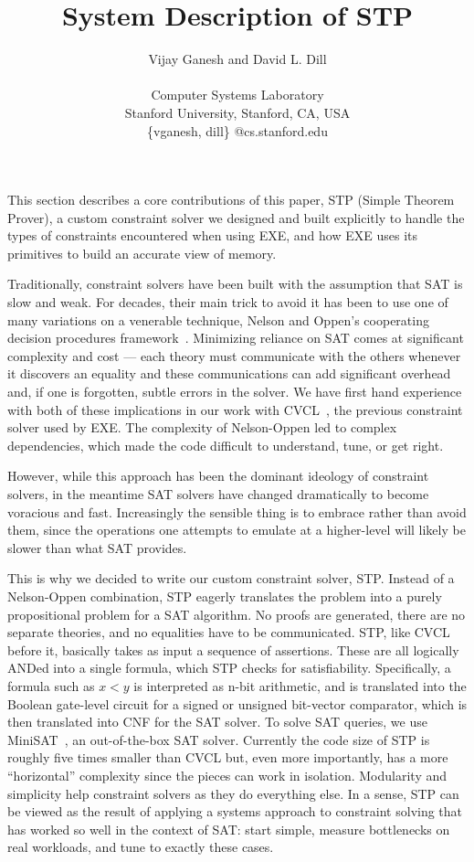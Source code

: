 \documentclass[11pt]{article}
\date{}
\title{System Description of STP}
\author{
Vijay Ganesh and David L. Dill \\
\\
Computer Systems Laboratory \\
Stanford University, Stanford, CA, USA \\
\{vganesh, dill\} @cs.stanford.edu}
\begin{document}
\maketitle

This section describes a core contributions of this paper, STP (Simple
Theorem Prover), a custom constraint solver we designed and built
explicitly to handle the types of constraints encountered when using
EXE, and how EXE uses its primitives to build an accurate view of
memory.

Traditionally, constraint solvers have been built with the assumption
that SAT is slow and weak.  For decades, their main trick to avoid it
has been to use one of many variations on a venerable technique,
Nelson and Oppen's cooperating decision procedures
framework~\cite{NelsonOppen}.  Minimizing reliance on SAT comes at
significant complexity and cost --- each theory must communicate with
the others whenever it discovers an equality and these communications
can add significant overhead and, if one is forgotten, subtle errors
in the solver.  We have first hand experience with both of these
implications in our work with CVCL~\cite{cvcl}, the previous
constraint solver used by EXE.  The complexity of Nelson-Oppen led to
complex dependencies, which made the code difficult to understand,
tune, or get right.

However, while this approach has been the dominant ideology of constraint
solvers, in the meantime SAT solvers have changed dramatically to become
voracious and fast.  Increasingly the sensible thing is to embrace
rather than avoid them, since the operations one attempts to emulate at
a higher-level will likely be slower than what SAT provides.

This is why we decided to write our custom constraint solver, STP.
Instead of a Nelson-Oppen combination, STP eagerly translates the
problem into a purely propositional problem for a SAT algorithm.  No
proofs are generated, there are no separate theories, and no
equalities have to be communicated.  STP, like CVCL before it,
basically takes as input a sequence of assertions.  These are all
logically ANDed into a single formula, which STP checks for
satisfiability.  Specifically, a formula such as $x < y$ is
interpreted as n-bit arithmetic, and is translated into the Boolean
gate-level circuit for a signed or unsigned bit-vector comparator,
which is then translated into CNF for the SAT solver.  To solve SAT
queries, we use MiniSAT~\cite{Minisat}, an out-of-the-box SAT solver.
Currently the code size of STP is roughly five times smaller than CVCL
but, even more importantly, has a more ``horizontal'' complexity since
the pieces can work in isolation.  Modularity and simplicity help
constraint solvers as they do everything else.  In a sense, STP can be
viewed as the result of applying a systems approach to constraint
solving that has worked so well in the context of SAT: start simple,
measure bottlenecks on real workloads, and tune to exactly
these cases.
\end{document}
